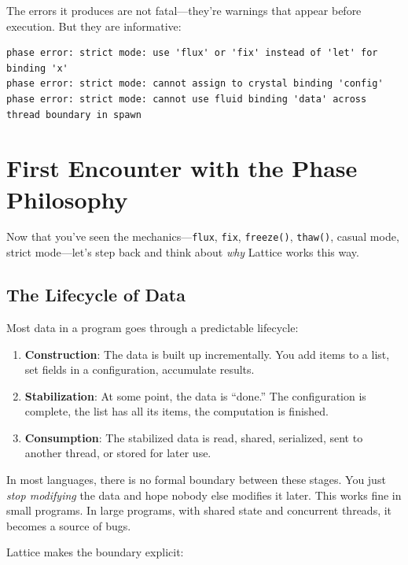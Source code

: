 The errors it produces are not fatal---they're warnings that appear before execution.
But they are informative:

\begin{lstlisting}[numbers=none]
phase error: strict mode: use 'flux' or 'fix' instead of 'let' for binding 'x'
phase error: strict mode: cannot assign to crystal binding 'config'
phase error: strict mode: cannot use fluid binding 'data' across thread boundary in spawn
\end{lstlisting}

\section{First Encounter with the Phase Philosophy}\label{sec:phase-philosophy}

Now that you've seen the mechanics---\lstinline|flux|, \lstinline|fix|, \lstinline|freeze()|, \lstinline|thaw()|, casual mode, strict mode---let's step back and think about \emph{why} Lattice works this way.

\subsection{The Lifecycle of Data}\label{subsec:data-lifecycle}

Most data in a program goes through a predictable lifecycle:

\begin{enumerate}
  \item \textbf{Construction}: The data is built up incrementally.
     You add items to a list, set fields in a configuration, accumulate results.
  \item \textbf{Stabilization}: At some point, the data is ``done.''
     The configuration is complete, the list has all its items, the computation is finished.
  \item \textbf{Consumption}: The stabilized data is read, shared, serialized, sent to another thread, or stored for later use.
\end{enumerate}

In most languages, there is no formal boundary between these stages.
You just \emph{stop modifying} the data and hope nobody else modifies it later.
This works fine in small programs.
In large programs, with shared state and concurrent threads, it becomes a source of bugs.

Lattice makes the boundary explicit:

